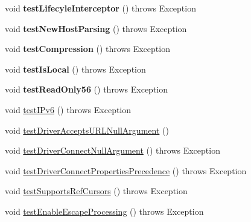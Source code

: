 \begin{DoxyCompactItemize}
\item 
\mbox{\label{classtestsuite_1_1simple_1_1_connection_test_ade9f97f7bb0875ac302b464bf8a00e40}} 
void {\bfseries test\+Lifecyle\+Interceptor} ()  throws Exception 
\item 
\mbox{\label{classtestsuite_1_1simple_1_1_connection_test_a2def0e0f5805bc123f27ecfaa3e1bbd7}} 
void {\bfseries test\+New\+Host\+Parsing} ()  throws Exception 
\item 
\mbox{\label{classtestsuite_1_1simple_1_1_connection_test_a22a442826a4f49a1fd5c67a310e296de}} 
void {\bfseries test\+Compression} ()  throws Exception 
\item 
\mbox{\label{classtestsuite_1_1simple_1_1_connection_test_ab0d2e15a6a5a5f0876ea643631a7ab96}} 
void {\bfseries test\+Is\+Local} ()  throws Exception 
\item 
\mbox{\label{classtestsuite_1_1simple_1_1_connection_test_afa59da66108d892d7a6b0f91775127a5}} 
void {\bfseries test\+Read\+Only56} ()  throws Exception 
\item 
void \mbox{\hyperlink{classtestsuite_1_1simple_1_1_connection_test_aaac71a7d7f1811f8ca555a3f8fb2573b}{test\+I\+Pv6}} ()  throws Exception 
\item 
void \mbox{\hyperlink{classtestsuite_1_1simple_1_1_connection_test_a20b111f18ff6ab2b7d2d95578d3613e4}{test\+Driver\+Accepts\+U\+R\+L\+Null\+Argument}} ()
\item 
void \mbox{\hyperlink{classtestsuite_1_1simple_1_1_connection_test_aafe08f45b914b4068e82456b8408401b}{test\+Driver\+Connect\+Null\+Argument}} ()  throws Exception 
\item 
void \mbox{\hyperlink{classtestsuite_1_1simple_1_1_connection_test_a92c8851ac00778b02dd81c2bb90d2d59}{test\+Driver\+Connect\+Properties\+Precedence}} ()  throws Exception 
\item 
void \mbox{\hyperlink{classtestsuite_1_1simple_1_1_connection_test_ad43851dc2d9601056a8fc521d543d6c1}{test\+Supports\+Ref\+Cursors}} ()  throws Exception 
\item 
void \mbox{\hyperlink{classtestsuite_1_1simple_1_1_connection_test_a64fec8e4893bf266e66b4f59ceeb323f}{test\+Enable\+Escape\+Processing}} ()  throws Exception 

\end{DoxyCompactItemize}
